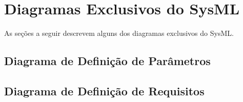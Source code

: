 \section{Diagramas Exclusivos do SysML}
As seções a seguir descrevem alguns dos diagramas exclusivos do SysML.

\subsection{Diagrama de Definição de Parâmetros}


\subsection{Diagrama de Definição de Requisitos}
